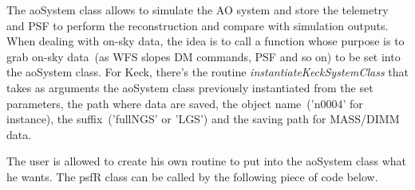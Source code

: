 \documentclass[12pt]{article}
\begin{document}
The aoSystem class allows to simulate the AO system and store the telemetry and PSF to perform the reconstruction and compare with simulation outputs. When dealing with on-sky data, the idea is to call a function whose purpose is to grab on-sky data~(as WFS slopes DM commands, PSF and so on) to be set into the aoSystem class. For Keck, there's the routine \emph{instantiateKeckSystemClass} that takes as arguments the aoSystem class previously instantiated from the set parameters, the path where data are saved, the object name~('n0004' for instance), the suffix~('fullNGS' or 'LGS') and the saving path for MASS/DIMM data.

The user is allowed to create his own routine to put into the aoSystem class what he wants. The psfR class can be called by the following piece of code below.

\begin{center}
\end{center}
\end{document}
